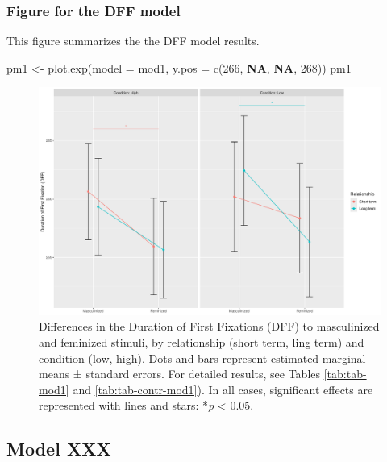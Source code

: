 \documentclass[
  bookmarksnumbered]{article}
\newenvironment{Shaded}{\begin{snugshade}}{\end{snugshade}}
\newcommand{\AttributeTok}[1]{\textcolor[rgb]{0.80,0.80,0.80}{#1}}
\newcommand{\ConstantTok}[1]{\textcolor[rgb]{0.86,0.64,0.64}{\textbf{#1}}}
\newcommand{\DecValTok}[1]{\textcolor[rgb]{0.86,0.86,0.80}{#1}}
\newcommand{\FunctionTok}[1]{\textcolor[rgb]{0.94,0.94,0.56}{#1}}
\newcommand{\NormalTok}[1]{\textcolor[rgb]{0.80,0.80,0.80}{#1}}
\newcommand{\OtherTok}[1]{\textcolor[rgb]{0.94,0.94,0.56}{#1}}
\begin{document}
\subsubsection{Figure for the DFF model}\label{figure-for-the-dff-model}

This figure summarizes the the DFF model results.

\begin{Shaded}
\begin{Highlighting}[]
\NormalTok{pm1 }\OtherTok{\textless{}{-}} \FunctionTok{plot.exp}\NormalTok{(}\AttributeTok{model =}\NormalTok{ mod1, }\AttributeTok{y.pos =} \FunctionTok{c}\NormalTok{(}\DecValTok{266}\NormalTok{, }\ConstantTok{NA}\NormalTok{, }\ConstantTok{NA}\NormalTok{, }\DecValTok{268}\NormalTok{))}
\NormalTok{pm1}
\end{Highlighting}
\end{Shaded}

\begin{figure}
\centering
\includegraphics{Supplementary_material_files/figure-latex/fig-mod1-1.pdf}
\caption{\label{fig:fig-mod1}Differences in the Duration of First Fixations (DFF) to masculinized and feminized stimuli, by relationship (short term, ling term) and condition (low, high). Dots and bars represent estimated marginal means ± standard errors. For detailed results, see Tables \ref{tab:tab-mod1} and \ref{tab:tab-contr-mod1}). In all cases, significant effects are represented with lines and stars: *\emph{p} \textless{} 0.05.}
\end{figure}

\subsection{Model XXX}\label{model-xxx}
\end{document}
